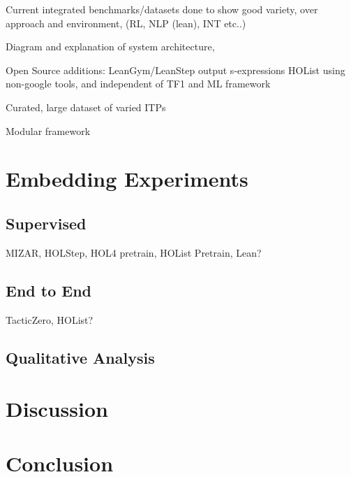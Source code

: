 \documentclass[letterpaper]{article} %
\begin{document}
    Current integrated benchmarks/datasets done to show good variety, over approach and environment, (RL, NLP (lean), INT etc..)

    Diagram and explanation of system architecture,

    Open Source additions:
    LeanGym/LeanStep output s-expressions
    HOList using non-google tools, and independent of TF1 and ML framework

    Curated, large dataset of varied ITPs

    Modular framework


    \section{Embedding Experiments}

    \subsection{Supervised}
    MIZAR, HOLStep, HOL4 pretrain, HOList Pretrain, Lean?

    \subsection{End to End}
    TacticZero, HOList?

    \subsection{Qualitative Analysis}


    \section{Discussion}


    \section{Conclusion}
\end{document}
